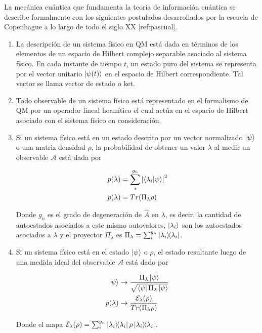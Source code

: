 La mecánica cuántica que fundamenta la teoría de información cuántica se describe formalmente con los siguientes postulados desarrollados por la escuela de Copenhague a lo largo de todo el siglo XX [ref:pascual].

\begin{enumerate}
    \item La descripción de un sistema físico en QM está dada en términos de los elementos de un espacio de Hilbert complejo separable asociado al sistema físico. En cada instante de tiempo $t$, un estado puro del sistema se representa por el vector unitario $\ket{\psi(t)}$ en el espacio de Hilbert correspondiente. Tal vector se llama vector de estado o ket.
    \item Todo observable de un sistema físico está representado en el formalismo de QM por un operador lineal hermítico el cual actúa en el espacio de Hilbert asociado con el sistema físico en consideración.
    \item Si un sistema físico está en un estado descrito por un vector normalizado $\ket{\psi}$ o una matriz densidad $\rho$, la probabilidad de obtener un valor $\lambda$ al medir un observable $\mathcal{A}$ está dada por 
        
        \begin{align}
            p(\lambda) &= \sum\limits_i^{g_n} \abs{\braket{\lambda_i}{\psi}}^2 \\
            p(\lambda) &= Tr(\Pi_\lambda \rho)
        \end{align}

        Donde $g_n$ es el grado de degeneración de $\hat{A}$ en $\lambda$, es decir, la cantidad de autoestados asociados a este mismo autovalores, $\ket{\lambda_i}$ son los autoestados asociados a $\lambda$ y el proyector $\Pi_\lambda$ es $\Pi_\lambda = \sum_i^{g_n} \ketbra{\lambda_i}$.

    \item Si un sistema físico está en el estado $\ket{\psi}$ o $\rho$, el estado resultante luego de una medida ideal del observable $\mathcal{A}$ está dado por

        \begin{align}
            \ket{\psi} &\rightarrow \frac{\Pi_\lambda \ket{\psi}}{\sqrt{\bra{\psi} \Pi_\lambda \ket{\psi}}} \\
            p(\lambda) &\rightarrow \frac{\mathcal{E}_\lambda(\rho)}{Tr(\Pi_\lambda \rho)}
        \end{align}

        Donde el mapa $\mathcal{E}_\lambda(\rho) = \sum_i^{g_n} \ketbra{\lambda_i} \rho \ketbra{\lambda_i}$.


\end{enumerate}
